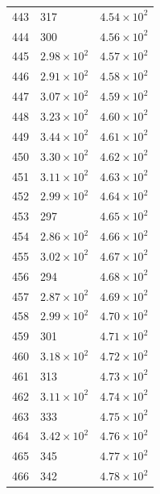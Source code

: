 \begin{table}[H]
\begin{tabular}{lll}
443 & 317 & $\displaystyle 4.54 \times 10^{2}$ \\
444 & 300 & $\displaystyle 4.56 \times 10^{2}$ \\
445 & $\displaystyle 2.98 \times 10^{2}$ & $\displaystyle 4.57 \times 10^{2}$ \\
446 & $\displaystyle 2.91 \times 10^{2}$ & $\displaystyle 4.58 \times 10^{2}$ \\
447 & $\displaystyle 3.07 \times 10^{2}$ & $\displaystyle 4.59 \times 10^{2}$ \\
448 & $\displaystyle 3.23 \times 10^{2}$ & $\displaystyle 4.60 \times 10^{2}$ \\
449 & $\displaystyle 3.44 \times 10^{2}$ & $\displaystyle 4.61 \times 10^{2}$ \\
450 & $\displaystyle 3.30 \times 10^{2}$ & $\displaystyle 4.62 \times 10^{2}$ \\
451 & $\displaystyle 3.11 \times 10^{2}$ & $\displaystyle 4.63 \times 10^{2}$ \\
452 & $\displaystyle 2.99 \times 10^{2}$ & $\displaystyle 4.64 \times 10^{2}$ \\
453 & 297 & $\displaystyle 4.65 \times 10^{2}$ \\
454 & $\displaystyle 2.86 \times 10^{2}$ & $\displaystyle 4.66 \times 10^{2}$ \\
455 & $\displaystyle 3.02 \times 10^{2}$ & $\displaystyle 4.67 \times 10^{2}$ \\
456 & 294 & $\displaystyle 4.68 \times 10^{2}$ \\
457 & $\displaystyle 2.87 \times 10^{2}$ & $\displaystyle 4.69 \times 10^{2}$ \\
458 & $\displaystyle 2.99 \times 10^{2}$ & $\displaystyle 4.70 \times 10^{2}$ \\
459 & 301 & $\displaystyle 4.71 \times 10^{2}$ \\
460 & $\displaystyle 3.18 \times 10^{2}$ & $\displaystyle 4.72 \times 10^{2}$ \\
461 & 313 & $\displaystyle 4.73 \times 10^{2}$ \\
462 & $\displaystyle 3.11 \times 10^{2}$ & $\displaystyle 4.74 \times 10^{2}$ \\
463 & 333 & $\displaystyle 4.75 \times 10^{2}$ \\
464 & $\displaystyle 3.42 \times 10^{2}$ & $\displaystyle 4.76 \times 10^{2}$ \\
465 & 345 & $\displaystyle 4.77 \times 10^{2}$ \\
466 & 342 & $\displaystyle 4.78 \times 10^{2}$ \\

\end{tabular}
\end{table}

